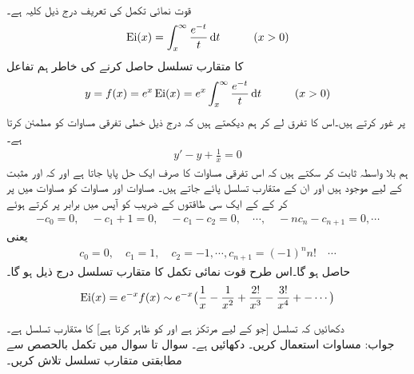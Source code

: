 \quad {}\\
قوت نمائی تکمل  کی تعریف درج ذیل کلیہ ہے۔
\begin{align*}
\Ei(x)=\int_{x}^{\infty} \frac{e^{-t}}{t}\dif t\quad \quad\quad (x>0)
\end{align*} 
 کا متقارب تسلسل حاصل کرنے کی خاطر ہم تفاعل
\begin{align*}
y=f(x)=e^x\Ei(x)=e^x\int_{x}^{\infty} \frac{e^{-t}}{t}\dif t\quad\quad \quad (x>0)
\end{align*}
پر غور کرتے ہیں۔اس کا تفرق لے کر ہم دیکھتے ہیں کہ  درج ذیل خطی تفرقی مساوات کو مطمئن کرتا ہے۔
\begin{align}\label{مساوات_اعدادی_جزو_دو_جزو_تفرق_ح}
y'-y+\frac{1}{x}=0
\end{align}
ہم بلا واسطہ ثابت کر سکتے ہیں کہ اس تفرقی مساوات کا صرف ایک حل  پایا جاتا ہے اور کہ   اور  مثبت  کے لیے موجود ہیں اور ان  کے متقارب تسلسل پائے جاتے ہیں۔ مساوات  اور مساوات  کو مساوات  میں پر کر کے  کے ایک سی طاقتوں کے  ضریب  کو آپس میں برابر پر کرتے ہوئے 
\begin{align*}
-c_0=0,\quad -c_1+1=0,\quad -c_1-c_2=0,\quad \cdots,\quad -nc_n-c_{n+1}=0,\cdots
\end{align*}
یعنی
\begin{align*}
c_0=0,\quad c_1=1,\quad c_2=-1,\cdots, c_{n+1}=(-1)^nn! \quad \cdots
\end{align*}
حاصل ہو گا۔اس طرح قوت نمائی تکمل کا متقارب تسلسل درج ذیل ہو  گا۔
\begin{align}\label{مساوات_اعدادی_جزو_دو_جزو_تفرق_خ}
\operatorname{Ei}(x)=e^{-x}f(x)\sim e^{-x}\big(\frac{1}{x}-\frac{1}{x^2}+\frac{2!}{x^3}-\frac{3!}{x^4}+-\cdots\big)
\end{align}

\quad
دکھائیں کہ تسلسل  [جو  کے لیے مرتکز ہے اور  کو ظاہر کرتا ہے]  کا متقارب تسلسل ہے۔\\
جواب:\quad
مساوات  استعمال کریں۔
\quad
دکھائیں  ہے۔
سوال  تا سوال  میں تکمل بالحصص سے مطابقتی متقارب تسلسل تلاش کریں۔

